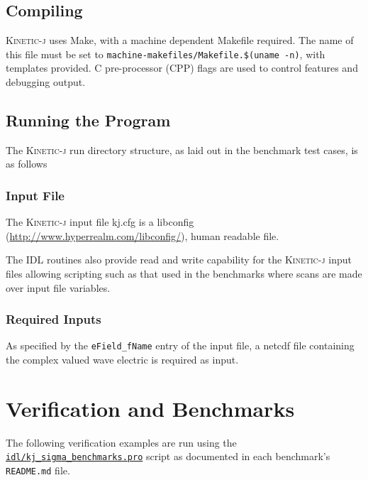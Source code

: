 \documentclass[final,5p,times,twocolumn]{elsarticle}
\newcommand{\kj}{\textsc{Kinetic-j}\xspace}
\begin{document}
\subsection{Compiling}
\label{section:running}
%
\kj uses Make, with a machine dependent Makefile required. The name of this file must be set to \texttt{machine-makefiles/Makefile.\$(uname -n)}, with templates provided. C pre-processor (CPP) flags are used to control features and debugging output. 

\subsection{Running the Program}
\label{section:running}
%
The \kj run directory structure, as laid out in the benchmark test cases, is as follows

\subsubsection{Input File}
\label{section:input_file}
The \kj input file kj.cfg is a libconfig (\url{http://www.hyperrealm.com/libconfig/}), human readable file. 
%
 
%
The IDL routines also provide read and write capability for the \kj input files allowing scripting such as that used in the benchmarks where scans are made over input file variables.  
%
\subsubsection{Required Inputs}
\label{section:inputs}
As specified by the \lstinline{eField_fName} entry of the input file, a netcdf file containing the complex valued wave electric is required as input. 
 
%
\section{Verification and Benchmarks}
\label{section:verification}
The following verification examples are run using the \href{https://github.com/ORNL-Fusion/kineticj/blob/master/idl/kj_sigma_benchmarks.pro}{\texttt{idl/kj\_sigma\_benchmarks.pro}} script as documented in each benchmark's \texttt{README.md} file.
\end{document}
